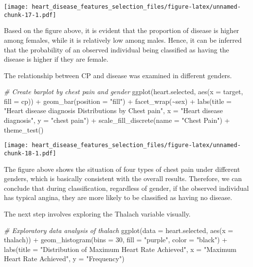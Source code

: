 \documentclass[
]{article}
\newenvironment{Shaded}{\begin{snugshade}}{\end{snugshade}}
\newcommand{\AttributeTok}[1]{\textcolor[rgb]{0.77,0.63,0.00}{#1}}
\newcommand{\CommentTok}[1]{\textcolor[rgb]{0.56,0.35,0.01}{\textit{#1}}}
\newcommand{\DecValTok}[1]{\textcolor[rgb]{0.00,0.00,0.81}{#1}}
\newcommand{\FunctionTok}[1]{\textcolor[rgb]{0.00,0.00,0.00}{#1}}
\newcommand{\NormalTok}[1]{#1}
\newcommand{\SpecialCharTok}[1]{\textcolor[rgb]{0.00,0.00,0.00}{#1}}
\newcommand{\StringTok}[1]{\textcolor[rgb]{0.31,0.60,0.02}{#1}}
\begin{document}
\texttt{[image: heart\_disease\_features\_selection\_files/figure-latex/unnamed-chunk-17-1.pdf]}

Based on the figure above, it is evident that the proportion of disease
is higher among females, while it is relatively low among males. Hence,
it can be inferred that the probability of an observed individual being
classified as having the disease is higher if they are female.

The relationship between CP and disease was examined in different
genders.

\begin{Shaded}
\begin{Highlighting}[]
\CommentTok{\# Create barplot by chest pain and gender}
\FunctionTok{ggplot}\NormalTok{(heart.selected, }\FunctionTok{aes}\NormalTok{(}\AttributeTok{x =}\NormalTok{ target, }\AttributeTok{fill =}\NormalTok{ cp)) }\SpecialCharTok{+}
  \FunctionTok{geom\_bar}\NormalTok{(}\AttributeTok{position =} \StringTok{"fill"}\NormalTok{) }\SpecialCharTok{+}
  \FunctionTok{facet\_wrap}\NormalTok{(}\SpecialCharTok{\textasciitilde{}}\NormalTok{sex) }\SpecialCharTok{+}
  \FunctionTok{labs}\NormalTok{(}\AttributeTok{title =} \StringTok{"Heart disease diagnosis Distributions by Chest pain"}\NormalTok{,}
       \AttributeTok{x =} \StringTok{"Heart disease diagnosis"}\NormalTok{,}
       \AttributeTok{y =} \StringTok{"chest pain"}\NormalTok{) }\SpecialCharTok{+}
  \FunctionTok{scale\_fill\_discrete}\NormalTok{(}\AttributeTok{name =} \StringTok{"Chest Pain"}\NormalTok{) }\SpecialCharTok{+}
  \FunctionTok{theme\_test}\NormalTok{()}
\end{Highlighting}
\end{Shaded}

\texttt{[image: heart\_disease\_features\_selection\_files/figure-latex/unnamed-chunk-18-1.pdf]}

The figure above shows the situation of four types of chest pain under
different genders, which is basically consistent with the overall
results. Therefore, we can conclude that during classification,
regardless of gender, if the observed individual has typical angina,
they are more likely to be classified as having no disease.

The next step involves exploring the Thalach variable visually.

\begin{Shaded}
\begin{Highlighting}[]
\CommentTok{\# Exploratory data analysis of thalach}
\FunctionTok{ggplot}\NormalTok{(}\AttributeTok{data =}\NormalTok{ heart.selected, }\FunctionTok{aes}\NormalTok{(}\AttributeTok{x =}\NormalTok{ thalach)) }\SpecialCharTok{+}
  \FunctionTok{geom\_histogram}\NormalTok{(}\AttributeTok{bins =} \DecValTok{30}\NormalTok{, }\AttributeTok{fill =} \StringTok{"purple"}\NormalTok{, }\AttributeTok{color =} \StringTok{"black"}\NormalTok{) }\SpecialCharTok{+}
  \FunctionTok{labs}\NormalTok{(}\AttributeTok{title =} \StringTok{"Distribution of Maximum Heart Rate Achieved"}\NormalTok{,}
       \AttributeTok{x =} \StringTok{"Maximum Heart Rate Achieved"}\NormalTok{, }\AttributeTok{y =} \StringTok{"Frequency"}\NormalTok{)}
\end{Highlighting}
\end{Shaded}
\end{document}
